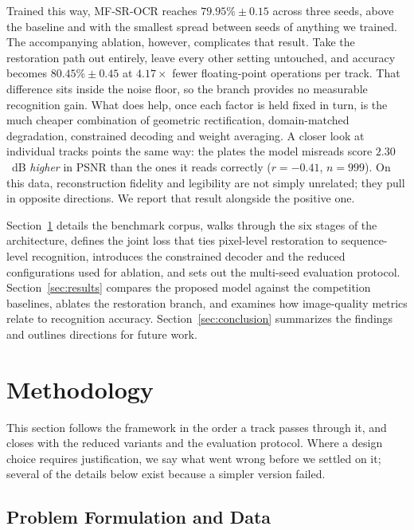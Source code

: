 \documentclass[runningheads]{llncs}
\begin{document}
Trained this way, MF-SR-OCR reaches $79.95\% \pm 0.15$ across three seeds, above the baseline and with the smallest spread between seeds of anything we trained. The accompanying ablation, however, complicates that result. Take the restoration path out entirely, leave every other setting untouched, and accuracy becomes $80.45\% \pm 0.45$ at $4.17\times$ fewer floating-point operations per track. That difference sits inside the noise floor, so the branch provides no measurable recognition gain. What does help, once each factor is held fixed in turn, is the much cheaper combination of geometric rectification, domain-matched degradation, constrained decoding and weight averaging. A closer look at individual tracks points the same way: the plates the model misreads score $2.30$~dB \emph{higher} in PSNR than the ones it reads correctly ($r = -0.41$, $n = 999$). On this data, reconstruction fidelity and legibility are not simply unrelated; they pull in opposite directions. We report that result alongside the positive one.

Section~\ref{sec:method} details the benchmark corpus, walks through the six stages of the architecture, defines the joint loss that ties pixel-level restoration to sequence-level recognition, introduces the constrained decoder and the reduced configurations used for ablation, and sets out the multi-seed evaluation protocol. Section~\ref{sec:results} compares the proposed model against the competition baselines, ablates the restoration branch, and examines how image-quality metrics relate to recognition accuracy. Section~\ref{sec:conclusion} summarizes the findings and outlines directions for future work.


\section{Methodology}
\label{sec:method}

This section follows the framework in the order a track passes through it, and closes with the reduced variants and the evaluation protocol. Where a design choice requires justification, we say what went wrong before we settled on it; several of the details below exist because a simpler version failed.


\subsection{Problem Formulation and Data}
\end{document}
